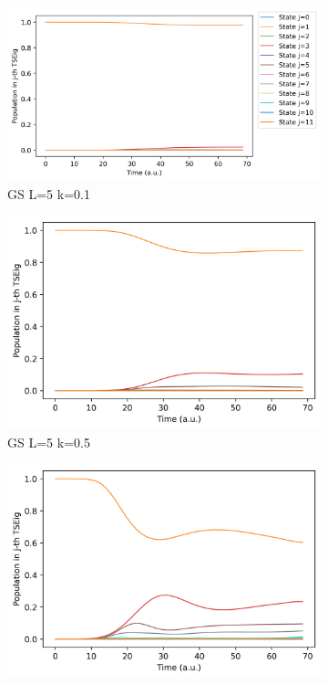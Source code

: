 \documentclass[11pt, a4paper]{article} %
\begin{document}
\begin{figure}[h!]
  \centering
  \begin{subfigure}[b]{0.36\linewidth}
    \includegraphics[width=\linewidth]{Population_GS_L5_k0_0.1.png}
    \caption{GS L=5 k=0.1}
  \end{subfigure}
    \begin{subfigure}[b]{0.30\linewidth}
    \includegraphics[width=\linewidth]{Population_GS_L5_k0_0.5.png}
    \caption{GS L=5 k=0.5}
  \end{subfigure}  
  \begin{subfigure}[b]{0.30\linewidth}
    \includegraphics[width=\linewidth]{Population_GS_L5_k0_1.0.png}

\end{subfigure}
\end{figure}
\end{document}
